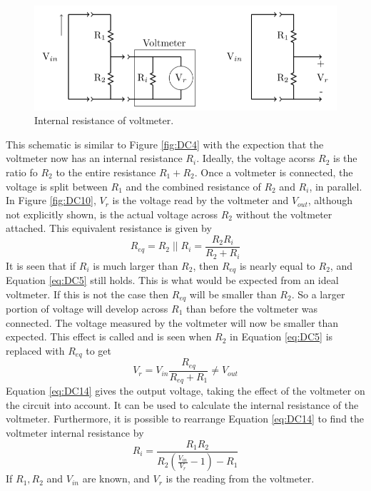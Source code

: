 \documentclass[12pt, a4paper, oneside, openright, titlepage]{book}
\begin{document}
\begin{figure}[H]
    \centering
    \includegraphics[scale = 0.8]{Images/DC10.PNG}
    \caption{Internal resistance of voltmeter.}
    \label{fig:}
\end{figure}

This schematic is similar to Figure \ref{fig:DC4} with the expection that the voltmeter now has an internal resistance $R_i$. Ideally, the voltage acorss $R_2$ is the ratio fo $R_2$ to the entire resistance $R_1+R_2$. Once a voltmeter is connected, the voltage is split between $R_1$ and the combined resistance of $R_2$ and $R_i$, in parallel. In Figure \ref{fig:DC10}, $V_r$ is the voltage read by the voltmeter and $V_{out}$, although not explicitly shown, is the actual voltage across $R_2$ without the voltmeter attached. This equivalent resistance is given by \begin{equation}\label{eq:DC13}
    R_{eq} = R_2\;\vert\vert\;R_i = \frac{R_2R_i}{R_2+R_i}
\end{equation}
It is seen that if $R_i$ is much larger than $R_2$, then $R_{eq}$ is nearly equal to $R_2$, and Equation \ref{eq:DC5} still holds. This is what would be expected from an ideal voltmeter. If this is not the case then $R_{eq}$ will be smaller than $R_2$. So a larger portion of voltage will develop across $R_1$ than before the voltmeter was connected. The voltage measured by the voltmeter will now be smaller than expected. This effect is called  and is seen when $R_2$ in Equation \ref{eq:DC5} is replaced with $R_{eq}$ to get \begin{equation}\label{eq:DC14}
    V_r = V_{in}\frac{R_{eq}}{R_{eq}+R_1} \neq V_{out}
\end{equation}
Equation \ref{eq:DC14} gives the output voltage, taking the effect of the voltmeter on the circuit into account. It can be used to calculate the internal resistance of the voltmeter. Furthermore, it is possible to rearrange Equation \ref{eq:DC14} to find the voltmeter internal resistance by \begin{equation}\label{eq:DC15}
    R_i = \frac{R_1R_2}{R_2\left(\frac{V_{in}}{V_r}-1\right)-R_1}
\end{equation}
If $R_1,R_2$ and $V_{in}$ are known, and $V_r$ is the reading from the voltmeter.
\end{document}

